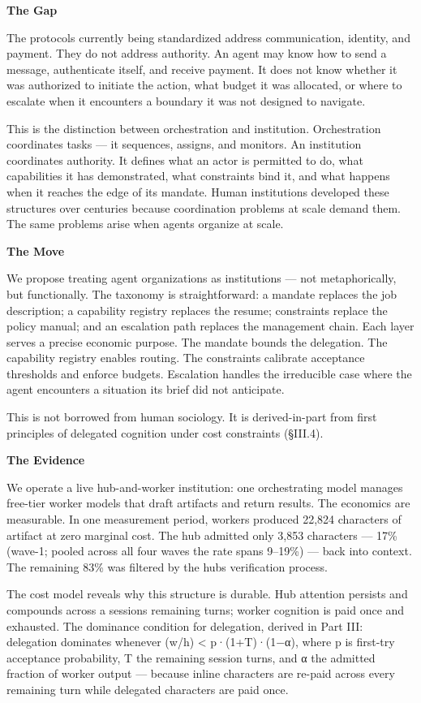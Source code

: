 \documentclass[
]{article}
\begin{document}
\textbf{The Gap}

The protocols currently being standardized address communication,
identity, and payment. They do not address authority. An agent may know
how to send a message, authenticate itself, and receive payment. It does
not know whether it was authorized to initiate the action, what budget
it was allocated, or where to escalate when it encounters a boundary it
was not designed to navigate.

This is the distinction between orchestration and institution.
Orchestration coordinates tasks --- it sequences, assigns, and monitors.
An institution coordinates authority. It defines what an actor is
permitted to do, what capabilities it has demonstrated, what constraints
bind it, and what happens when it reaches the edge of its mandate. Human
institutions developed these structures over centuries because
coordination problems at scale demand them. The same problems arise when
agents organize at scale.

\textbf{The Move}

We propose treating agent organizations as institutions --- not
metaphorically, but functionally. The taxonomy is straightforward: a
mandate replaces the job description; a capability registry replaces the
resume; constraints replace the policy manual; and an escalation path
replaces the management chain. Each layer serves a precise economic
purpose. The mandate bounds the delegation. The capability registry
enables routing. The constraints calibrate acceptance thresholds and
enforce budgets. Escalation handles the irreducible case where the agent
encounters a situation its brief did not anticipate.

This is not borrowed from human sociology. It is derived-in-part from
first principles of delegated cognition under cost constraints (§III.4).

\textbf{The Evidence}

We operate a live hub-and-worker institution: one orchestrating model
manages free-tier worker models that draft artifacts and return results.
The economics are measurable. In one measurement period, workers
produced 22,824 characters of artifact at zero marginal cost. The hub
admitted only 3,853 characters --- 17\% (wave-1; pooled across all four
waves the rate spans 9--19\%) --- back into context. The remaining 83\%
was filtered by the hub\textquotesingle s verification process.

The cost model reveals why this structure is durable. Hub attention
persists and compounds across a session\textquotesingle s remaining
turns; worker cognition is paid once and exhausted. The dominance
condition for delegation, derived in Part III: delegation dominates
whenever (w/h) \textless{} p·(1+T)·(1−α), where p is first-try
acceptance probability, T the remaining session turns, and α the
admitted fraction of worker output --- because inline characters are
re-paid across every remaining turn while delegated characters are paid
once.
\end{document}
